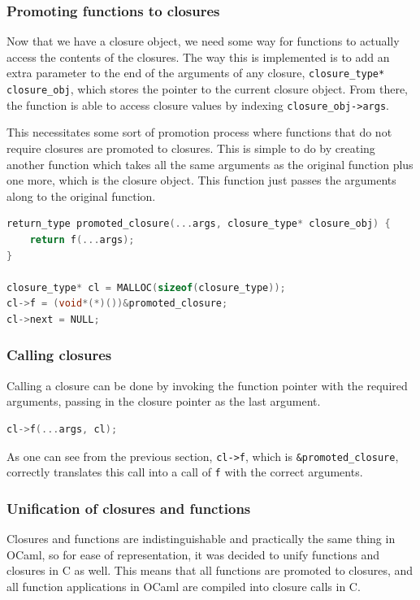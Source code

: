 \documentclass[12pt,a4paper,twoside,openright]{report}
\begin{document}
\subsubsection{Promoting functions to closures}

Now that we have a closure object, we need some way for functions to actually 
access the contents of the closures. The way this is implemented is to add an 
extra parameter to the end of the arguments of any closure, 
\verb|closure_type* closure_obj|, which stores the pointer to the current 
closure object. From there, the function is able to access closure values by 
indexing \verb|closure_obj->args|.

This necessitates some sort of promotion process where functions that do not 
require closures are promoted to closures. This is simple to do by creating 
another function which takes all the same arguments as the original function 
plus one more, which is the closure object. This function just passes the 
arguments along to the original function.

\begin{lstlisting}[language=C]
return_type promoted_closure(...args, closure_type* closure_obj) {
    return f(...args);
}

closure_type* cl = MALLOC(sizeof(closure_type));
cl->f = (void*(*)())&promoted_closure;
cl->next = NULL;
\end{lstlisting}

\subsubsection{Calling closures}

Calling a closure can be done by invoking the function pointer with the 
required arguments, passing in the closure pointer as the last argument.

\begin{lstlisting}[language=C]
cl->f(...args, cl);
\end{lstlisting}

As one can see from the previous section, \texttt{cl->f}, which is 
\verb|&promoted_closure|, correctly translates this call into a call of 
\texttt{f} with the correct arguments.

\subsubsection{Unification of closures and functions}

Closures and functions are indistinguishable and practically the same thing in 
OCaml, so for ease of representation, it was decided to unify functions and 
closures in C as well. This means that all functions are promoted to closures, 
and all function applications in OCaml are compiled into closure calls in C.
\end{document}
